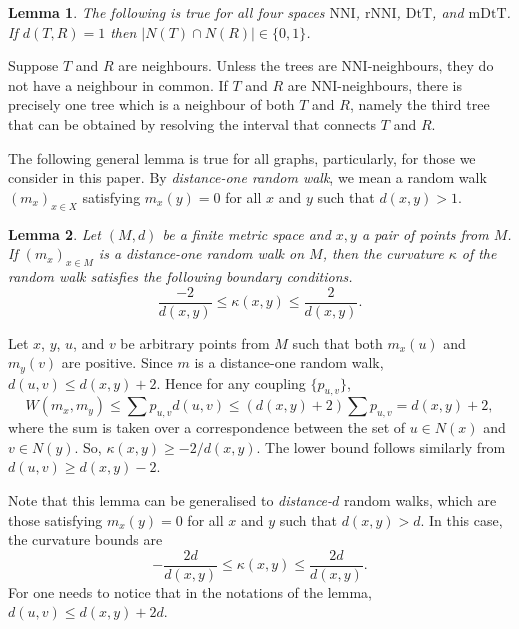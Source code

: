 \documentclass{amsart}
\newtheorem{lemma}{Lemma}
\newcommand{\dts}{\mathrm{DtT}}
\newcommand{\nni}{\mathrm{NNI}}
\newcommand{\rnni}{\mathrm{rNNI}}
\newcommand{\mdts}{\mathrm{mDtT}}
\begin{document}
\begin{lemma}\label{intersecNeighb}
The following is true for all four spaces $\nni$, $\rnni$, $\dts$, and $\mdts$.
If $d(T,R) = 1$ then $|N(T)\cap N(R)|\in\{0,1\}$.
\end{lemma}

\proof
Suppose $T$ and $R$ are neighbours.
Unless the trees are NNI-neighbours, they do not have a neighbour in common.
If $T$ and $R$ are NNI-neighbours, there is precisely one tree which is a neighbour of both $T$ and $R$, namely the third tree that can be obtained by resolving the interval that connects $T$ and $R$.
\endproof

The following general lemma is true for all graphs, particularly, for those we consider in this paper.
By {\em distance-one random walk}, we mean a random walk $(m_x)_{x \in X}$ satisfying $m_x(y) = 0$ for all $x$ and $y$ such that $d(x,y) > 1$.

\begin{lemma}\label{curvBoundGeneral}
Let $(M,d)$ be a finite metric space and $x,y$ a pair of points from $M$. If
$(m_x)_{x \in M}$ is a distance-one random walk on $M$, then the curvature
$\kappa$ of the random walk satisfies the following boundary conditions.
\[
\dfrac{-2}{d(x,y)} \leq \kappa(x,y) \leq \dfrac{2}{d(x,y)}.
\]
\end{lemma}

\proof
Let $x$, $y$, $u$, and $v$ be arbitrary points from $M$ such that both $m_x(u)$
and $m_y(v)$ are positive. Since $m$ is a distance-one random walk,
$d(u,v) \leq d(x,y) + 2$. Hence for any coupling $\{p_{u,v}\}$,
\[
W(m_x,m_y) \leq \sum p_{u,v} d(u,v) \leq (d(x,y)+2)\sum p_{u,v} = d(x,y) + 2,
\]
where the sum is taken over a correspondence between the set of $u \in N(x)$ and
$v \in N(y)$. So, $\kappa(x,y) \geq - 2/d(x,y)$. The lower bound follows
similarly from $d(u,v) \geq d(x,y) - 2$.
\endproof

Note that this lemma can be generalised to {\em distance-$d$} random walks,
which are those satisfying $m_x(y) = 0$ for all $x$ and $y$ such that
$d(x,y) > d$. In this case, the curvature bounds are
\[
-\dfrac{2d}{d(x,y)} \leq \kappa(x,y) \leq \dfrac{2d}{d(x,y)}.
\]
For one needs to notice that in the notations of the lemma,
$d(u,v) \leq d(x,y) + 2d$.
\end{document}

